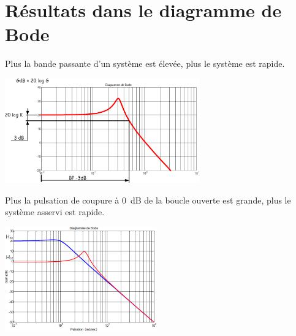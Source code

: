 \documentclass[10pt,fleqn]{article} %
\begin{document}
\section{Résultats dans le diagramme de Bode}


\noindent\begin{minipage}[c]{.48\linewidth}
\begin{resultat}
Plus la bande passante d'un système est élevée, plus le système est rapide.
\end{resultat}

\begin{center}
\includegraphics[height=4.5cm]{images/bandepassante}
\end{center}

\end{minipage} \hfill
\begin{minipage}[c]{.48\linewidth}
\begin{resultat}
Plus la pulsation de coupure à \SI{0}{dB} de la boucle ouverte est grande, plus le système asservi est rapide.
\end{resultat}


\begin{center}
\includegraphics[height=4.5cm]{images/bobf}
\end{center}
\end{minipage}



%
%
%
%
%
%
%
\end{document}
